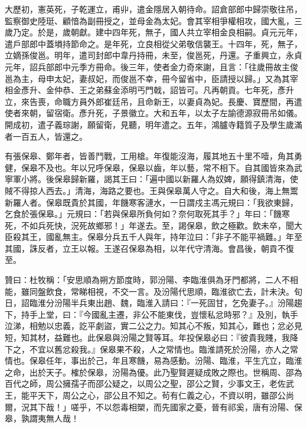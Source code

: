 \begin{pinyinscope}
 大歷初，憲英死，子乾運立，甫丱，遣金隱居入朝待命。詔倉部郎中歸崇敬往吊，監察御史陸珽、顧愔為副冊授之，並母金為太妃。會其宰相爭權相攻，國大亂，三歲乃定。於是，歲朝獻。建中四年死，無子，國人共立宰相金良相嗣。貞元元年，遣戶部郎中蓋塤持節命之。是年死，立良相從父弟敬信襲王。十四年，死，無子，立嫡孫俊邕。明年，遣司封郎中韋丹持冊，未至，俊邕死，丹還。子重興立，永貞元年，詔兵部郎中元季方冊命。後三年，使者金力奇來謝，且言：「往歲冊故主俊邕為主，母申太妃，妻叔妃，而俊邕不幸，冊今留省中，臣請授以歸。」又為其宰相金彥升、金仲恭、王之弟蘇金添明丐門戟，詔皆可。凡再朝貢。七年死，彥升立，來告喪，命職方員外郎崔廷吊，且命新王，以妻貞為妃。長慶、寶歷間，再遣使者來朝，留宿衛。彥升死，子景徽立。大和五年，以太子左諭德源寂冊吊如儀。開成初，遣子義琮謝，願留衛，見聽，明年遣之。五年，鴻臚寺籍質子及學生歲滿者一百五人，皆還之。



 有張保皋、鄭年者，皆善鬥戰，工用槍。年復能沒海，履其地五十里不噎，角其勇健，保皋不及也。年以兄呼保皋，保皋以齒，年以藝，常不相下。自其國皆來為武寧軍小將。後保皋歸新羅，謁其王曰：「遍中國以新羅人為奴婢，願得鎮清海，使賊不得掠人西去。」清海，海路之要也。王與保皋萬人守之。自大和後，海上無鬻新羅人者。保皋既貴於其國，年饑寒客漣水，一日謂戍主馮元規曰：「我欲東歸，乞食於張保皋。」元規曰：「若與保皋所負何如？奈何取死其手？」年曰：「饑寒死，不如兵死快，況死故鄉邪！」年遂去。至，謁保皋，飲之極歡。飲未卒，聞大臣殺其王，國亂無主。保皋分兵五千人與年，持年泣曰：「非子不能平禍難。」年至其國，誅反者，立王以報。王遂召保皋為相，以年代守清海。會昌後，朝貢不復至。



 贊曰：杜牧稱：「安思順為朔方節度時，郭汾陽、李臨淮俱為牙門都將，二人不相能，雖同盤飲食，常睇相視，不交一言。及汾陽代思順，臨淮欲亡去，計未決。旬日，詔臨淮分汾陽半兵東出趙、魏，臨淮入請曰：『一死固甘，乞免妻子。』汾陽趨下，持手上堂，曰：『今國亂主遷，非公不能東伐，豈懷私忿時邪？』及別，執手泣涕，相勉以忠義，訖平劇盜，實二公之力。知其心不叛，知其心，難也；忿必見短，知其材，益難也。此保皋與汾陽之賢等耳。年投保皋必曰：『彼貴我賤，我降下之，不宜以舊忿殺我。』保皋果不殺，人之常情也。臨淮請死於汾陽，亦人之常情也。保皋任年，事出於己，年且寒饑，易為感動。汾陽、臨淮，平生亢立，臨淮之命，出於天子。榷於保皋，汾陽為優。此乃聖賢遲疑成敗之際也。世稱周、邵為百代之師，周公擁孺子而邵公疑之，以周公之聖，邵公之賢，少事文王，老佐武王，能平天下，周公之心，邵公且不知之。茍有仁義之心，不資以明，雖邵公尚爾，況其下哉！」嗟乎，不以怨毒相槊，而先國家之憂，晉有祁奚，唐有汾陽、保皋，孰謂夷無人哉！




\end{pinyinscope}
